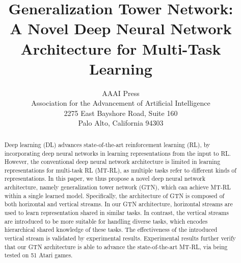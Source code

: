\documentclass[letterpaper]{article} %
\begin{document}
%



\newcommand{\argmin}{\operatornamewithlimits{argmin}}
\newcommand{\argmax}{\operatornamewithlimits{argmax}}

\newcommand{\tabincell}[2]{\begin{tabular}{@{}#1@{}}#2\end{tabular}}

\newtheorem{theorem}{$\textbf{Theorem}$}
\newtheorem{lemma}[theorem]{$\textbf{Lemma}$}

\def\abovestrut#1{\rule[0in]{0in}{#1}\ignorespaces}
\def\belowstrut#1{\rule[-#1]{0in}{#1}\ignorespaces}
\def\abovespace{\abovestrut{0.01in}}
\def\belowspace{\belowstrut{-0.01in}}

\title{Generalization Tower Network: \\
A Novel Deep Neural Network Architecture for Multi-Task Learning}
\author{AAAI Press\\
Association for the Advancement of Artificial Intelligence\\
2275 East Bayshore Road, Suite 160\\
Palo Alto, California 94303\\
}
\maketitle
\begin{abstract}
Deep learning (DL) advances state-of-the-art reinforcement learning (RL), by incorporating deep neural networks in learning representations from the input to RL. However, the conventional deep neural network architecture is limited in learning representations for multi-task RL (MT-RL), as multiple tasks refer to different kinds of representations. In this paper, we thus propose a novel deep neural network architecture, namely generalization tower network (GTN), which can achieve MT-RL within a single learned model. Specifically, the architecture of GTN is composed of both horizontal and vertical streams. In our GTN architecture, horizontal streams are used to learn representation shared in similar tasks. In contrast, the vertical streams are introduced to be more suitable for handling diverse tasks, which encodes hierarchical shared knowledge of these tasks. The effectiveness of the introduced vertical stream is validated by experimental results. Experimental results further verify that our GTN architecture is able to advance the state-of-the-art MT-RL, via being tested on 51 Atari games.
\end{abstract}
\end{document}
